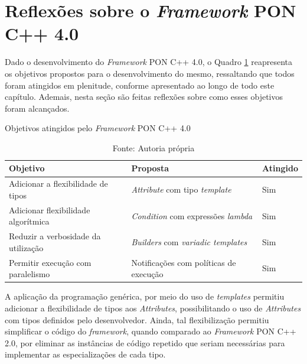 
\section{Reflexões sobre o \textit{Framework} PON C++ 4.0}\label{sec:dev_reflex}

Dado o desenvolvimento do \textit{Framework} PON C++ 4.0, o Quadro
\ref{tab:obj_fw4_atingidos} reapresenta os objetivos propostos para o
desenvolvimento do mesmo, ressaltando que todos foram atingidos em plenitude,
conforme apresentado ao longo de todo este capítulo. Ademais, nesta seção são
feitas reflexões sobre como esses objetivos foram alcançados.

\begin{table}[!htb]
\centering
\caption{Objetivos atingidos pelo \textit{Framework} PON C++ 4.0}
\smallskip
\begin{tabularx}{\textwidth}{|l|X|l|}\hline
    Objetivo & Proposta & Atingido  \\\hline\hline
    Adicionar a flexibilidade de tipos & \textit{Attribute} com tipo \textit{template} & Sim \\ \hline
    Adicionar flexibilidade algorítmica & \textit{Condition} com expressões \textit{lambda} & Sim \\ \hline
    Reduzir a verbosidade da utilização & \textit{Builders} com \textit{variadic templates} & Sim \\ \hline
    Permitir execução com paralelismo & Notificações com políticas de execução & Sim \\ \hline
    \end{tabularx}
    \caption*{Fonte: Autoria própria}
    \label{tab:obj_fw4_atingidos}
\end{table}

A aplicação da programação genérica, por meio do uso de \textit{templates}
permitiu adicionar a flexibilidade de tipos aos \textit{Attributes},
possibilitando o uso de \textit{Attributes} com tipos definidos pelo
desenvolvedor. Ainda, tal flexibilização permitiu simplificar o código do
\textit{framework}, quando comparado ao \textit{Framework} PON C++ 2.0, por
eliminar as instâncias de código repetido que seriam necessárias para
implementar as especializações de cada tipo. 

